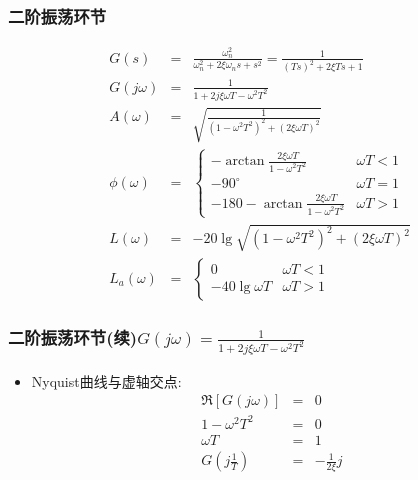 \documentclass[table]{article}
\begin{document}
\subsubsection{二阶振荡环节}
\label{sec:org0c0383f}
\begin{eqnarray*}
G(s) & = & \frac{\omega_n^2}{\omega_n^2 +2\xi\omega_n s + s^2}
       =   \frac{1}{(Ts)^2+2\xi Ts+1} \\
G(j\omega) & =& \frac{1}{1+2j\xi\omega T-\omega^2 T^2}\\
A(\omega) &=& \sqrt{\frac{1}{(1-\omega^2 T^2)^2+(2\xi\omega T)^2}}\\
\phi(\omega) &=& 
\begin{cases}
-\arctan\frac{2\xi\omega T}{1-\omega^2 T^2} & \omega T <1 \\
-90^{\circ} & \omega T =1 \\
-180-\arctan\frac{2\xi\omega T}{1-\omega^2 T^2} & \omega T >1 
\end{cases} \\
L(\omega)&=& -20\lg\sqrt{(1-\omega^2 T^2)^2+(2\xi\omega T)^2}\\
L_a(\omega)&=& 
\begin{cases} 0 & \omega T<1 \\ 
-40\lg\omega T & \omega T>1
\end{cases}
\end{eqnarray*}

\subsubsection{二阶振荡环节(续)\(G(j\omega) = \frac{1}{1+2j\xi\omega T-\omega^2 T^2}\)}
\label{sec:orgb7873e6}
\begin{itemize}
\item Nyquist曲线与虚轴交点:
\begin{eqnarray*}
\Re[G(j\omega)] &=& 0\\
1-\omega^2 T^2 &=& 0\\
\omega T &=&1\\
G(j\frac{1}{T})&=&-\frac{1}{2\xi}j
\end{eqnarray*}
\end{itemize}
\end{document}
